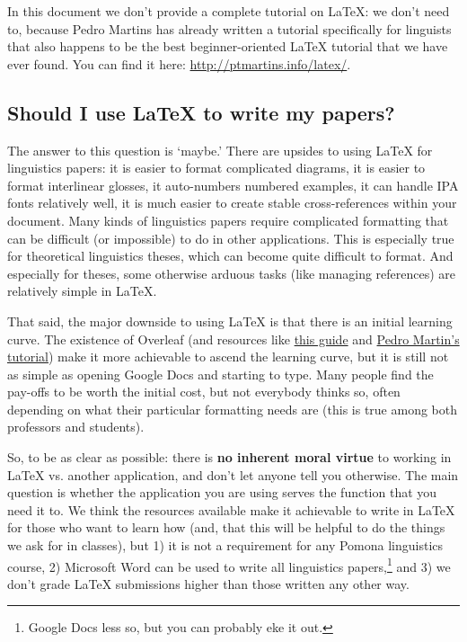 \documentclass{article}
\begin{document}
In this document we don't provide a complete tutorial on \LaTeX{}: we don't need to, because Pedro Martins has already written a tutorial specifically for linguists that also happens to be the best beginner-oriented \LaTeX{} tutorial that we have ever found. You can find it here: \url{http://ptmartins.info/latex/}.

\subsection{Should I use \LaTeX{} to write my papers?}

The answer to this question is `maybe.' There are upsides to using \LaTeX{} for linguistics papers: it is easier to format complicated diagrams, it is easier to format interlinear glosses, it auto-numbers numbered examples, it can handle IPA fonts relatively well, it is much easier to create stable cross-references within your document. Many kinds of linguistics papers require complicated formatting that can be difficult (or impossible) to do in other applications. This is especially true for theoretical linguistics theses, which can become quite difficult to format. And especially for theses, some otherwise arduous tasks (like managing references) are relatively simple in \LaTeX{}.

That said, the major downside to using \LaTeX{} is that there is an initial learning curve. The existence of Overleaf (and resources like \href{https://www.overleaf.com/latex/templates/pomona-linguistics-quick-reference-guide/jthrqbrktmrd}{this guide} and \href{http://ptmartins.info/latex/}{Pedro Martin's tutorial}) make it more achievable to ascend the learning curve, but it is still not as simple as opening Google Docs and starting to type. Many people find the pay-offs to be worth the initial cost, but not everybody thinks so, often depending on what their particular formatting needs are (this is true among both professors and students). 

So, to be as clear as possible: there is \textbf{no inherent moral virtue} to working in \LaTeX{} vs. another application, and don't let anyone tell you otherwise. The main question is whether the application you are using serves the function that you need it to. We think the resources available make it achievable to write in \LaTeX{} for those who want to learn how (and, that this will be helpful to do the things we ask for in classes), but 1) it is not a requirement for any Pomona linguistics course, 2) Microsoft Word can be used to write all linguistics papers,\footnote{Google Docs less so, but you can probably eke it out.} and 3) we don't grade \LaTeX{} submissions higher than those written any other way.
\end{document}
